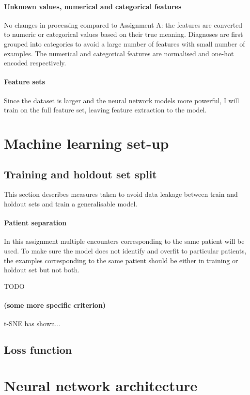 \documentclass[10pt, twocolumn]{article}
\begin{document}
\paragraph{Unknown values, numerical and categorical features} No changes in processing compared to Assignment A: the features are converted to numeric or categorical values based on their true meaning. Diagnoses are first grouped into categories to avoid a large number of features with small number of examples. The numerical and categorical features are normalised and one-hot encoded respectively.

\paragraph{Feature sets} Since the dataset is larger and the neural network models more powerful, I will train on the full feature set, leaving feature extraction to the model.

\section{Machine learning set-up}

\subsection{Training and holdout set split}
This section describes measures taken to avoid data leakage between train and holdout sets and train a generalisable model.

\paragraph{Patient separation} In this assignment multiple encounters corresponding to the same patient will be used. To make sure the model does not identify and overfit to particular patients, the examples corresponding to the same patient should be either in training or holdout set but not both.

TODO \paragraph{(some more specific criterion)} t-SNE has shown...


\subsection{Loss function}

\section{Neural network architecture}
\end{document}
